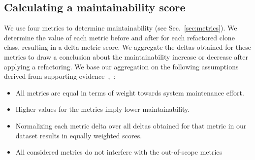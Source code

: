 \documentclass[sigconf,review,anonymous]{acmart}
\begin{document}


\subsection{Calculating a maintainability score}\label{sec:metricformula}
We use four metrics to determine maintainability (see Sec.~\ref{sec:metrics}). We determine the value of each metric before and after for each refactored clone class, resulting in a delta metric score. We aggregate the deltas obtained for these metrics to draw a conclusion about the maintainability increase or decrease after applying a refactoring. We base our aggregation on the following assumptions derived from supporting evidence~\cite{heitlager2007practical},~\cite{alves2010deriving}:
\begin{itemize}
  \item All metrics are equal in terms of weight towards system maintenance effort.
  \item Higher values for the metrics imply lower maintainability.
  \item Normalizing each metric delta over all deltas obtained for that metric in our dataset results in equally weighted
  scores.%
  \item All considered metrics do not interfere with the out-of-scope metrics
\end{itemize}
\end{document}
